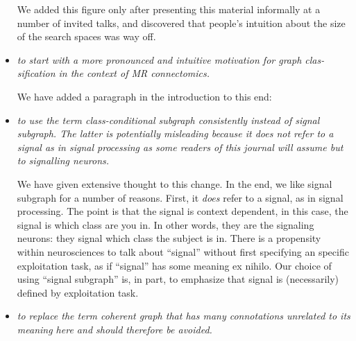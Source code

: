 \begin{itemize}
	We added this figure only after presenting this material informally at a number of invited talks, and discovered that people's intuition about the size of the search spaces was way off.
	
	\item \emph{to start with a more pronounced and intuitive motivation for graph clas- sification in the context of MR connectomics.}
	
	We have added a paragraph in the introduction to this end:
	
	
	
	\item \emph{to use the term class-conditional subgraph consistently instead of signal subgraph. The latter is potentially misleading because it does not refer to a signal as in signal processing as some readers of this journal will assume but to signalling neurons.}
	
	We have given extensive thought to this change.  In the end, we like signal subgraph for a number of reasons.  First, it \emph{does} refer to a signal, as in signal processing.  The point is that the signal is context dependent, in this case, the signal is which class are you in.  In other words, they are the signaling neurons: they signal which class the subject is in.  There is a propensity within neurosciences to talk about ``signal'' without first specifying an specific exploitation task, as if ``signal'' has some meaning ex nihilo.  Our choice of using ``signal subgraph'' is, in part, to emphasize that signal is (necessarily) defined by exploitation task.
	
	\item \emph{to replace the term coherent graph that has many connotations unrelated to its meaning here and should therefore be avoided.}
	

\end{itemize}

